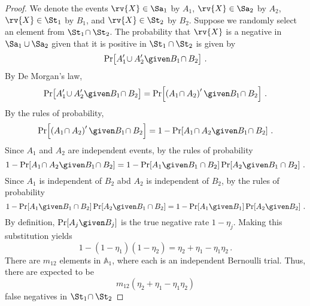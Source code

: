 \documentclass[ ../main.tex]{subfiles}
\begin{document}
\begin{proof}
We denote the events $\rv{X} \in \Sa_1$ by $A_1$, $\rv{X} \in \Sa_2$ by $A_2$, $\rv{X} \in \St_1$ by $B_1$, and $\rv{X} \in \St_2$ by $B_2$. Suppose we randomly select an element from $\St_1 \!\cap \St_2$. The probability that $\rv{X}$ is a negative in $\Sa_1 \cup \Sa_2$ given that it is positive in $\St_1 \cap \St_2$ is given by
\begin{equation}
    \Pr\!\left[A_1' \! \cup A_2' \given B_1 \! \cap B_2\right]\,.
\end{equation}
By De Morgan's law,
\begin{equation}
    \Pr\!\left[A_1' \! \cup A_2' \given B_1 \! \cap B_2\right] = \Pr\!\left[\left(A_1 \! \cap A_2\right)' \given B_1 \! \cap B_2\right]\,.
\end{equation}
By the rules of probability,
\begin{equation}
    \Pr\!\left[\left(A_1 \! \cap A_2\right)' \given B_1 \! \cap B_2\right] = 1 - \Pr\!\left[A_1 \! \cap A_2 \given B_1 \! \cap B_2\right]\,.
\end{equation}
Since $A_1$ and $A_2$ are independent events, by the rules of probability \begin{equation}
    1 - \Pr\!\left[A_1 \! \cap A_2 \given B_1 \! \cap B_2\right] = 1 - \Pr\!\left[A_1 \given B_1 \cap B_2\right] \Pr\!\left[A_2 \given B_1 \cap B_2\right]\,.
\end{equation}
Since $A_1$ is independent of $B_2$ abd $A_2$ is independent of $B_2$, by the rules of probability
\begin{equation}
    1 - \Pr\!\left[A_1 \given B_1 \cap B_2\right] \Pr\!\left[A_2 \given B_1 \cap B_2\right] = 1 - \Pr\!\left[A_1 \given B_1\right] \Pr\!\left[A_2 \given B_2\right]\,.
\end{equation}
By definition, $\Pr[A_j \given B_j]$ is the true negative rate $1 - \eta_j$. Making this substitution yields
\begin{equation}
    1 - (1 - \eta_1)(1 - \eta_2) = \eta_2 + \eta_1 - \eta_1 \eta_2\,.
\end{equation}
There are $m_{1 2}$ elements in $\mathbb{A}_1$, where each is an independent Bernoulli trial. Thus, there are expected to be
\begin{equation}
\label{eq:proof_union_fn_1}
    m_{1 2} \left(\eta_2 + \eta_1 - \eta_1 \eta_2\right)
\end{equation}
false negatives in $\St_1 \! \cap \St_2$


\end{proof}
\end{document}
